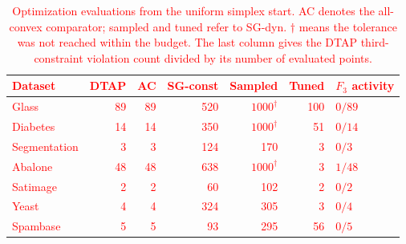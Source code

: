 \documentclass[]{interact}
\theoremstyle{plain}
\theoremstyle{definition}
\theoremstyle{remark}
\begin{document}
\begin{table}[t]
\centering\small
\setlength{\tabcolsep}{4pt}
\caption{\textcolor{red}{Optimization evaluations from the uniform simplex start.
AC denotes the all-convex comparator; sampled and tuned refer to SG-dyn.
$\dagger$ means the tolerance was not reached within the budget.
The last column gives the DTAP third-constraint violation count divided
by its number of evaluated points.}}
\label{tab:activation-tuning}
\begin{tabular}{@{}lrrrrrl@{}}
\toprule
\leavevmode\textcolor{red}{Dataset} & \leavevmode\textcolor{red}{DTAP} & \leavevmode\textcolor{red}{AC} & \leavevmode\textcolor{red}{SG-const} & \leavevmode\textcolor{red}{Sampled} & \leavevmode\textcolor{red}{Tuned} & \leavevmode\textcolor{red}{$F_3$ activity}\\
\midrule
\leavevmode\textcolor{red}{Glass}        & \leavevmode\textcolor{red}{89} & \leavevmode\textcolor{red}{89} & \leavevmode\textcolor{red}{520} & \leavevmode\textcolor{red}{$1000^\dagger$} & \leavevmode\textcolor{red}{100} & \leavevmode\textcolor{red}{$0/89$}\\
\leavevmode\textcolor{red}{Diabetes}     & \leavevmode\textcolor{red}{14} & \leavevmode\textcolor{red}{14} & \leavevmode\textcolor{red}{350} & \leavevmode\textcolor{red}{$1000^\dagger$} & \leavevmode\textcolor{red}{51} & \leavevmode\textcolor{red}{$0/14$}\\
\leavevmode\textcolor{red}{Segmentation} & \leavevmode\textcolor{red}{3} & \leavevmode\textcolor{red}{3} & \leavevmode\textcolor{red}{124} & \leavevmode\textcolor{red}{170} & \leavevmode\textcolor{red}{3} & \leavevmode\textcolor{red}{$0/3$}\\
\leavevmode\textcolor{red}{Abalone}      & \leavevmode\textcolor{red}{48} & \leavevmode\textcolor{red}{48} & \leavevmode\textcolor{red}{638} & \leavevmode\textcolor{red}{$1000^\dagger$} & \leavevmode\textcolor{red}{3} & \leavevmode\textcolor{red}{$1/48$}\\
\leavevmode\textcolor{red}{Satimage}     & \leavevmode\textcolor{red}{2} & \leavevmode\textcolor{red}{2} & \leavevmode\textcolor{red}{60} & \leavevmode\textcolor{red}{102} & \leavevmode\textcolor{red}{2} & \leavevmode\textcolor{red}{$0/2$}\\
\leavevmode\textcolor{red}{Yeast}        & \leavevmode\textcolor{red}{4} & \leavevmode\textcolor{red}{4} & \leavevmode\textcolor{red}{324} & \leavevmode\textcolor{red}{305} & \leavevmode\textcolor{red}{3} & \leavevmode\textcolor{red}{$0/4$}\\
\leavevmode\textcolor{red}{Spambase}     & \leavevmode\textcolor{red}{5} & \leavevmode\textcolor{red}{5} & \leavevmode\textcolor{red}{93} & \leavevmode\textcolor{red}{295} & \leavevmode\textcolor{red}{56} & \leavevmode\textcolor{red}{$0/5$}\\

\end{tabular}
\end{table}
\end{document}
